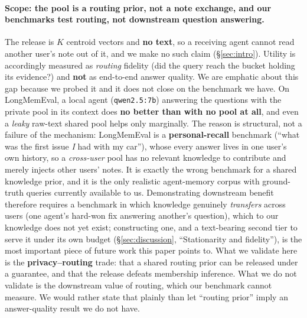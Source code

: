 \documentclass[pdflatex,sn-mathphys-num,iicol]{sn-jnl}
\theoremstyle{thmstyleone}%
\theoremstyle{thmstyletwo}%
\theoremstyle{thmstylethree}%
\newcommand{\secref}[1]{\S\ref{#1}}
\begin{document}
\paragraph{Scope: the pool is a routing prior, not a note exchange, and our benchmarks test
routing, not downstream question answering.} The release is $K$ centroid vectors and \textbf{no
text}, so a receiving agent cannot read another user's note out of it, and we make no such claim
(\secref{sec:intro}). Utility is accordingly measured as \emph{routing} fidelity (did the query
reach the bucket holding its evidence?) and \textbf{not} as end-to-end answer quality. We are
emphatic about this gap because we probed it and it does not close on the benchmark we have. On
LongMemEval, a local agent (\texttt{qwen2.5:7b}) answering the questions with the private pool in
its context does \textbf{no better than with no pool at all}, and even a \emph{leaky} raw-text
shared pool helps only marginally. The reason is structural, not a failure of the mechanism:
LongMemEval is a \textbf{personal-recall} benchmark (``what was the first issue \emph{I} had with
my car''), whose every answer lives in one user's own history, so a \emph{cross-user} pool has no
relevant knowledge to contribute and merely injects other users' notes. It is exactly the wrong
benchmark for a shared knowledge prior, and it is the only realistic agent-memory corpus with
ground-truth queries currently available to us. Demonstrating downstream benefit therefore requires
a benchmark in which knowledge genuinely \emph{transfers} across users (one agent's hard-won fix
answering another's question), which to our knowledge does not yet exist; constructing one, and a
text-bearing second tier to serve it under its own budget (\secref{sec:discussion}, ``Stationarity
and fidelity''), is the most important piece of future work this paper points to. What we validate
here is the \textbf{privacy--routing} trade: that a shared routing prior can be released under a
guarantee, and that the release defeats membership inference. What we do not validate is the
downstream value of routing, which our benchmark cannot measure. We would rather state that plainly
than let ``routing prior'' imply an answer-quality result we do not have.
\end{document}
